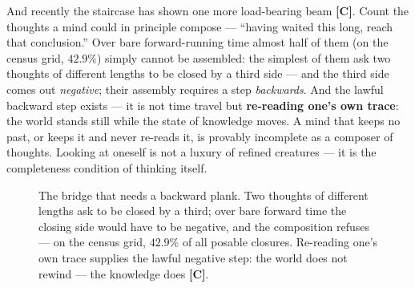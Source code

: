 \documentclass[11pt,letterpaper]{article}
\newcommand{\stC}{\textbf{[C]}\xspace}
\begin{document}
And recently the staircase has shown one more load-bearing beam
\stC. Count the thoughts a mind could in principle compose ---
``having waited this long, reach that conclusion.'' Over bare
forward-running time almost half of them (on the census grid,
$42.9\%$) simply cannot be assembled: the simplest of them ask two
thoughts of different lengths to be closed by a third side --- and
the third side comes out \emph{negative}; their assembly requires a
step \emph{backwards}. And the lawful backward step exists --- it
is not time travel but \textbf{re-reading one's own trace}: the
world stands still while the state of knowledge moves. A mind that
keeps no past, or keeps it and never re-reads it, is provably
incomplete as a composer of thoughts. Looking at oneself is not a
luxury of refined creatures --- it is the completeness condition of
thinking itself.

\begin{figure}[H]
\centering
{}
\caption{The bridge that needs a backward plank. Two thoughts of
different lengths ask to be closed by a third; over bare forward
time the closing side would have to be negative, and the
composition refuses --- on the census grid, $42.9\%$ of all posable
closures. Re-reading one's own trace supplies the lawful negative
step: the world does not rewind --- the knowledge does \stC.}
\label{fig:reread}
\end{figure}
\end{document}
